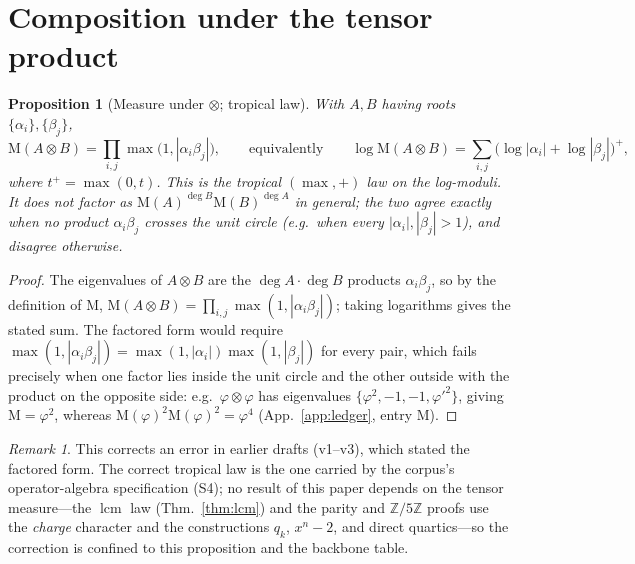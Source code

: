 \documentclass[11pt]{article}
\newtheorem{proposition}[theorem]{Proposition}
\theoremstyle{definition}
\theoremstyle{remark}
\newtheorem{remark}[theorem]{Remark}
\newcommand{\Mah}{\mathrm{M}}
\newcommand{\Z}{\mathbb{Z}}
\newcommand{\gold}{\varphi}
\newcommand{\tens}{\otimes}
\newcommand{\Zmod}[1]{\Z/#1\Z}
\begin{document}
\section{Composition under the tensor product}\label{sec:compose}

\begin{proposition}[Measure under $\tens$; tropical law]\label{prop:tensM}
With $A,B$ having roots $\{\alpha_i\},\{\beta_j\}$,
\[
\Mah(A\tens B)=\prod_{i,j}\max\bigl(1,|\alpha_i\beta_j|\bigr),
\qquad\text{equivalently}\qquad
\log\Mah(A\tens B)=\sum_{i,j}\bigl(\log|\alpha_i|+\log|\beta_j|\bigr)^{+},
\]
where $t^{+}=\max(0,t)$. This is the tropical $(\max,+)$ law on the log-moduli. It does
\emph{not} factor as $\Mah(A)^{\deg B}\Mah(B)^{\deg A}$ in general; the two agree exactly when
no product $\alpha_i\beta_j$ crosses the unit circle (e.g.\ when every $|\alpha_i|,|\beta_j|>1$),
and disagree otherwise.
\end{proposition}
\begin{proof}
The eigenvalues of $A\tens B$ are the $\deg A\cdot\deg B$ products $\alpha_i\beta_j$, so by the
definition of $\Mah$, $\Mah(A\tens B)=\prod_{i,j}\max(1,|\alpha_i\beta_j|)$; taking logarithms
gives the stated sum. The factored form would require
$\max(1,|\alpha_i\beta_j|)=\max(1,|\alpha_i|)\max(1,|\beta_j|)$ for every pair, which fails
precisely when one factor lies inside the unit circle and the other outside with the product on
the opposite side: e.g.\ $\gold\tens\gold$ has eigenvalues $\{\gold^{2},-1,-1,\gold'^{2}\}$,
giving $\Mah=\gold^{2}$, whereas $\Mah(\gold)^{2}\Mah(\gold)^{2}=\gold^{4}$
(App.~\ref{app:ledger}, entry M).
\end{proof}

\begin{remark}
This corrects an error in earlier drafts (v1--v3), which stated the factored form. The
correct tropical law is the one carried by the corpus's operator-algebra specification (S4);
no result of this paper depends on the tensor measure---the $\operatorname{lcm}$ law
(Thm.~\ref{thm:lcm}) and the parity and $\Zmod5$ proofs use the \emph{charge} character and
the constructions $q_k$, $x^{n}-2$, and direct quartics---so the correction is confined to
this proposition and the backbone table.
\end{remark}
\end{document}
